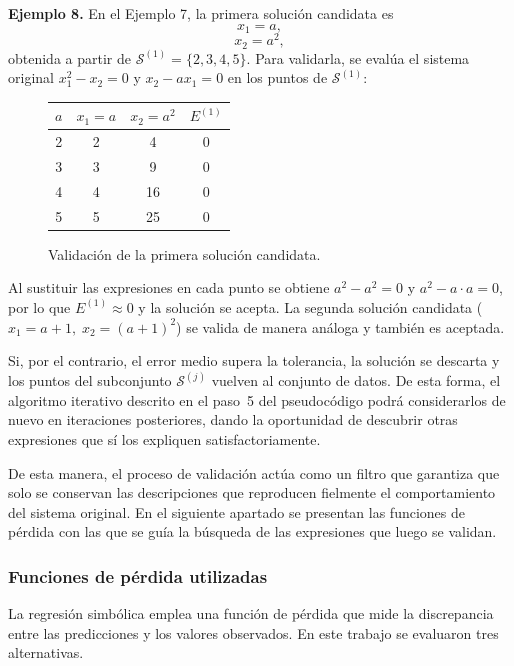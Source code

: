 \documentclass{article} \usepackage[utf8]{inputenc} \usepackage[spanish]{babel} \spanishdecimal{.} \usepackage{amsmath, amssymb, amsthm} \usepackage{bm} \usepackage{float} \usepackage{longtable} \usepackage[hidelinks]{hyperref}
\begin{document}
\bigskip
\noindent\textbf{Ejemplo 8.} En el Ejemplo 7, la primera solución
candidata es
\[
x_1 = a,
\]
\[
x_2 = a^2,
\]
obtenida a partir de \(\mathcal{S}^{(1)} = \{2, 3, 4, 5\}\). Para
validarla, se evalúa el sistema original
\(x_1^2 - x_2 = 0\) y \(x_2 - a x_1 = 0\) en los puntos de
\(\mathcal{S}^{(1)}\):

\begin{figure}[H]
\centering
\begin{tabular}{c|c|c|c}
\(a\) & \(x_1 = a\) & \(x_2 = a^2\) & \(E^{(1)}\) \\
\hline
2 & 2 & 4 & 0 \\
3 & 3 & 9 & 0 \\
4 & 4 & 16 & 0 \\
5 & 5 & 25 & 0
\end{tabular}
\caption{Validación de la primera solución candidata.}
\label{fig:validacion_ejemplo8}
\end{figure}

Al sustituir las expresiones en cada punto se obtiene
\(a^2 - a^2 = 0\) y \(a^2 - a \cdot a = 0\), por lo que
\(E^{(1)} \approx 0\) y la solución se acepta. La segunda solución
candidata (\(x_1 = a + 1,\; x_2 = (a+1)^2\)) se valida de manera
análoga y también es aceptada.

Si, por el contrario, el error medio supera la tolerancia, la solución
se descarta y los puntos del subconjunto \(\mathcal{S}^{(j)}\) vuelven
al conjunto de datos. De esta forma, el algoritmo iterativo descrito en
el paso~5 del pseudocódigo podrá considerarlos de nuevo en iteraciones
posteriores, dando la oportunidad de descubrir otras expresiones que sí
los expliquen satisfactoriamente.

De esta manera, el proceso de validación actúa como un filtro que
garantiza que solo se conservan las descripciones que reproducen
fielmente el comportamiento del sistema original. En el siguiente
apartado se presentan las funciones de pérdida con las que se guía la
búsqueda de las expresiones que luego se validan.
\subsubsection{Funciones de pérdida utilizadas} \label{sec:funciones_perdida}

La regresión simbólica emplea una función de pérdida que mide la discrepancia entre las predicciones y los valores observados. En este trabajo se evaluaron tres alternativas.
\end{document}
